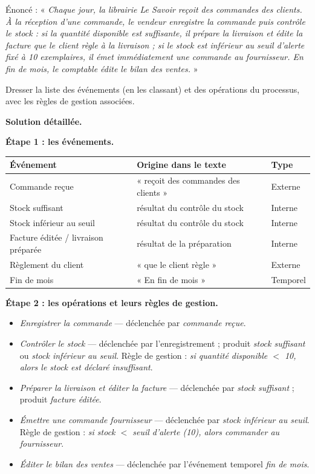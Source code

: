 \documentclass[11pt]{article}
\begin{document}
\begin{exoresolu}
Énoncé : « \emph{Chaque jour, la librairie Le Savoir reçoit des commandes des clients. À la réception d'une commande, le vendeur enregistre la commande puis contrôle le stock : si la quantité disponible est suffisante, il prépare la livraison et édite la facture que le client règle à la livraison ; si le stock est inférieur au seuil d'alerte fixé à 10 exemplaires, il émet immédiatement une commande au fournisseur. En fin de mois, le comptable édite le bilan des ventes.} »

Dresser la liste des événements (en les classant) et des opérations du processus, avec les règles de gestion associées.

\tcblower
\textbf{Solution détaillée.}

\textbf{Étape 1 : les événements.}

\begin{center}
\begin{tabularx}{\linewidth}{|l|X|l|}
\hline
\rowcolor{popblueL} \textbf{Événement} & \textbf{Origine dans le texte} & \textbf{Type} \\
\hline
Commande reçue & « reçoit des commandes des clients » & Externe \\
\hline
Stock suffisant & résultat du contrôle du stock & Interne \\
\hline
Stock inférieur au seuil & résultat du contrôle du stock & Interne \\
\hline
Facture éditée / livraison préparée & résultat de la préparation & Interne \\
\hline
Règlement du client & « que le client règle » & Externe \\
\hline
Fin de mois & « En fin de mois » & Temporel \\
\hline
\end{tabularx}
\end{center}

\textbf{Étape 2 : les opérations et leurs règles de gestion.}

\begin{itemize}
\item \emph{Enregistrer la commande} — déclenchée par \emph{commande reçue}.
\item \emph{Contrôler le stock} — déclenchée par l'enregistrement ; produit \emph{stock suffisant} ou \emph{stock inférieur au seuil}. Règle de gestion : \emph{si quantité disponible $<$ 10, alors le stock est déclaré insuffisant}.
\item \emph{Préparer la livraison et éditer la facture} — déclenchée par \emph{stock suffisant} ; produit \emph{facture éditée}.
\item \emph{Émettre une commande fournisseur} — déclenchée par \emph{stock inférieur au seuil}. Règle de gestion : \emph{si stock $<$ seuil d'alerte (10), alors commander au fournisseur}.
\item \emph{Éditer le bilan des ventes} — déclenchée par l'événement temporel \emph{fin de mois}.
\end{itemize}


\end{exoresolu}
\end{document}
